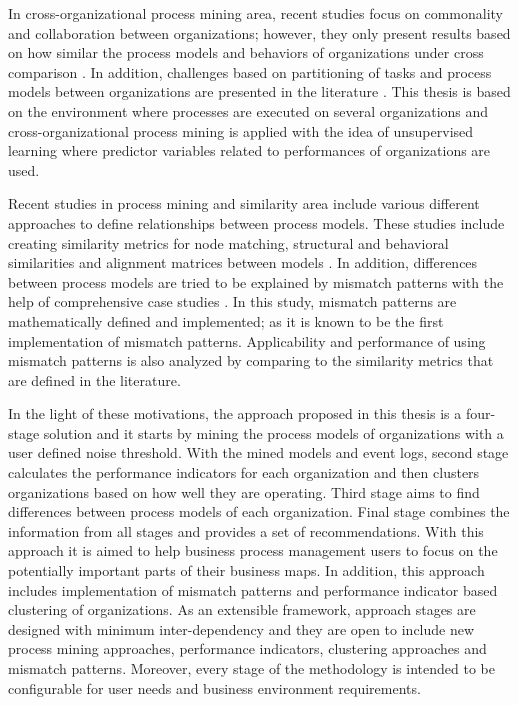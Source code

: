 In cross-organizational process mining area, recent studies focus on commonality and collaboration between organizations; however, they only present results based on how similar the process models and behaviors of organizations under cross comparison \cite{buijs2012towards}. In addition, challenges based on partitioning of tasks and process models between organizations are presented in the literature \cite{van2011intra}. This thesis is based on the environment where processes are executed on several organizations and cross-organizational process mining is applied with the idea of unsupervised learning where predictor variables related to performances of organizations are used.

Recent studies in process mining and similarity area  include various different approaches to define relationships between process models. These studies include creating similarity metrics for node matching, structural and behavioral similarities \cite{dijkman2011similarity} and alignment matrices between models \cite{buijs2014comparing}. In addition, differences between process models are tried to be explained by mismatch patterns with the help of comprehensive case studies \cite{dijkman2007mismatch}. In this study, mismatch patterns are mathematically defined and implemented; as it is known to be the first implementation of mismatch patterns. Applicability and performance of using mismatch patterns is also analyzed by comparing to the similarity metrics that are defined in the literature. 

In the light of these motivations, the approach proposed in this thesis is a four-stage solution and it starts by mining the process models of organizations with a user defined noise threshold. With the mined models and event logs, second stage calculates the performance indicators for each organization and then clusters organizations based on how well they are operating. Third stage aims to find differences between process models of each organization. Final stage combines the information from all stages and provides a set of recommendations. With this approach it is aimed to help business process management users to focus on the potentially important parts of their business maps. In addition, this approach includes implementation of mismatch patterns and performance indicator based clustering of organizations. As an extensible framework, approach stages are designed with minimum inter-dependency and they are open to include new process mining approaches, performance indicators, clustering approaches and mismatch patterns. Moreover, every stage of the methodology is intended to be configurable for user needs and business environment requirements.

